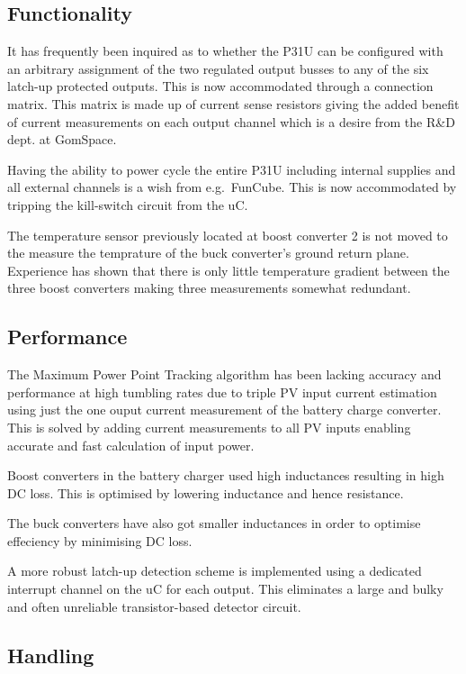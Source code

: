 \documentclass[9pt,a4paper]{article}
\begin{document}
\subsection{Functionality}

It has frequently been inquired as to whether the P31U can be configured
with an arbitrary assignment of the two regulated output busses to any
of the six latch-up protected outputs. This is now accommodated through
a connection matrix. This matrix is made up of current sense resistors
giving the added benefit of current measurements on each output channel
which is a desire from the R\&D dept. at GomSpace.

Having the ability to power cycle the entire P31U including internal
supplies and all external channels is a wish from e.g.~FunCube. This is
now accommodated by tripping the kill-switch circuit from the uC.

The temperature sensor previously located at boost converter 2 is not
moved to the measure the temprature of the buck converter's ground
return plane. Experience has shown that there is only little temperature
gradient between the three boost converters making three measurements
somewhat redundant.

\subsection{Performance}

The Maximum Power Point Tracking algorithm has been lacking accuracy and
performance at high tumbling rates due to triple PV input current
estimation using just the one ouput current measurement of the battery
charge converter. This is solved by adding current measurements to all
PV inputs enabling accurate and fast calculation of input power.

Boost converters in the battery charger used high inductances resulting
in high DC loss. This is optimised by lowering inductance and hence
resistance.

The buck converters have also got smaller inductances in order to
optimise effeciency by minimising DC loss.

A more robust latch-up detection scheme is implemented using a dedicated
interrupt channel on the uC for each output. This eliminates a large and
bulky and often unreliable transistor-based detector circuit.

\subsection{Handling}
\end{document}
